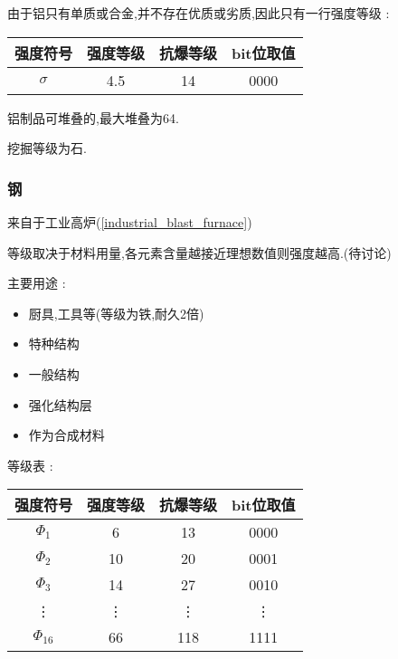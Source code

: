 {{{          由于铝只有单质或合金,并不存在优质或劣质,因此只有一行强度等级 :
          \begin{center}
              \begin{tabular}{|c|c|c|c|}
                  \hline
                  强度符号 & 强度等级 & 抗爆等级 & bit位取值 \\
                  \hline
                  $\sigma$ & 4.5      & 14       & 0000      \\
                  \hline
              \end{tabular}
          \end{center}

          铝制品可堆叠的,最大堆叠为64.

          挖掘等级为石.
      }

      \subsubsection{钢}{
          来自于工业高炉({\ref{industrial_blast_furnace}})

          等级取决于材料用量,各元素含量越接近理想数值则强度越高.(待讨论)

          主要用途 :
          \begin{itemize}[itemsep=1pt]
              \item 厨具,工具等(等级为铁,耐久2倍)
              \item 特种结构
              \item 一般结构
              \item 强化结构层
              \item 作为合成材料
          \end{itemize}

          等级表 :

          \begin{center}
              \begin{tabular}{|c|c|c|c|}
                  \hline
                  强度符号  & 强度等级 & 抗爆等级 & bit位取值 \\
                  \hline
                  $\Phi_1$  & 6        & 13       & 0000      \\
                  \hline
                  $\Phi_2$  & 10       & 20       & 0001      \\
                  \hline
                  $\Phi_3$  & 14       & 27       & 0010      \\
                  \vdots    & \vdots   & \vdots   & \vdots    \\
                  $\Phi_{16}$ & 66       & 118      & 1111      \\
                  \hline
              \end{tabular}
          \end{center}

}}}
